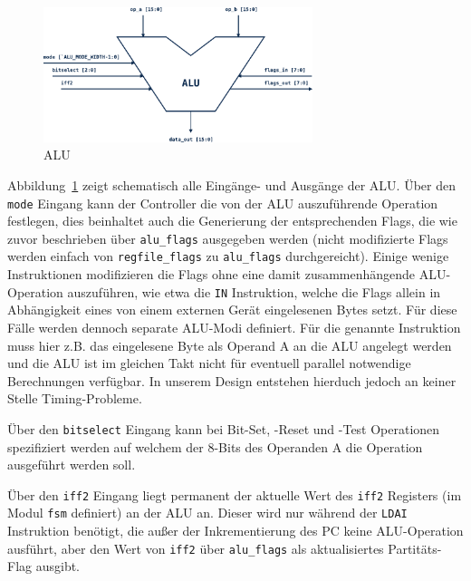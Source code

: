 \documentclass[ngerman, cd=lightcolor]{tudscrreprt}
\begin{document}
\begin{figure}[htbp]
  \centering
    \includegraphics[width=0.7\textwidth]{resources/pdf/alu.pdf}
  \caption{ALU}
  \label{img:alu}
\end{figure}

\noindent
Abbildung~\ref{img:alu} zeigt schematisch alle Eingänge- und Ausgänge der ALU.
Über den \texttt{mode} Eingang kann der Controller die von der ALU
auszuführende Operation festlegen, dies beinhaltet auch die Generierung der
entsprechenden Flags, die wie zuvor beschrieben über \texttt{alu\_flags}
ausgegeben werden (nicht modifizierte Flags werden einfach von
\texttt{regfile\_flags} zu \texttt{alu\_flags} durchgereicht).  Einige wenige
Instruktionen modifizieren die Flags ohne eine damit zusammenhängende
ALU-Operation auszuführen, wie etwa die \texttt{IN} Instruktion, welche die
Flags allein in Abhängigkeit eines von einem externen Gerät eingelesenen Bytes
setzt. Für diese Fälle werden dennoch separate ALU-Modi definiert. Für die
genannte Instruktion muss hier z.B. das eingelesene Byte als Operand A an die
ALU angelegt werden und die ALU ist im gleichen Takt nicht für eventuell
parallel notwendige Berechnungen verfügbar. In unserem Design entstehen
hierduch jedoch an keiner Stelle Timing-Probleme.

Über den \texttt{bitselect} Eingang kann bei Bit-Set, -Reset und -Test
Operationen spezifiziert werden auf welchem der 8-Bits des Operanden A die
Operation ausgeführt werden soll.

Über den \texttt{iff2} Eingang liegt permanent der aktuelle Wert des
\texttt{iff2} Registers (im Modul \texttt{fsm} definiert) an der ALU an. Dieser
wird nur während der \texttt{LDAI} Instruktion benötigt, die außer der
Inkrementierung des PC keine ALU-Operation ausführt, aber den Wert von
\texttt{iff2} über \texttt{alu\_flags} als aktualisiertes Partitäts-Flag
ausgibt.
\end{document}

